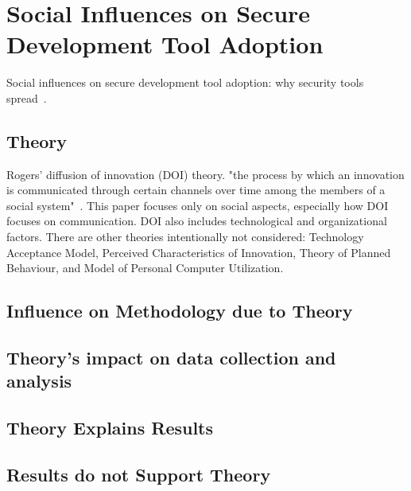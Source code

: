 \documentclass[12pt]{IEEEtran}
\begin{document}

\section{Social Influences on Secure Development Tool Adoption}

Social influences on secure development tool adoption: why security tools spread~\cite{xiao2014social}.


\subsection{Theory}

Rogers' diffusion of innovation (DOI) theory.
"the process by which an innovation is communicated through certain channels over time among the members of a social system"~\cite{rogers1995attributes}.
This paper focuses only on social aspects, especially how DOI focuses on communication.
DOI also includes technological and organizational factors.
There are other theories intentionally not considered: Technology Acceptance Model, Perceived Characteristics of Innovation, Theory of Planned Behaviour, and Model of Personal Computer Utilization.


\subsection{Influence on Methodology due to Theory}

\subsection{Theory's impact on data collection and analysis}

\subsection{Theory Explains Results}
\subsection{Results do not Support Theory} %



\end{document}
